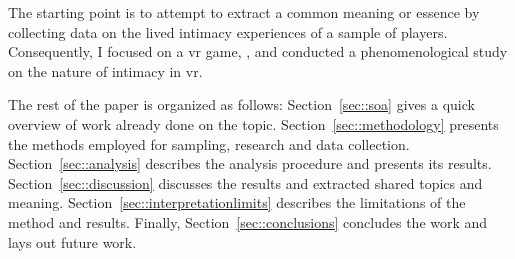 The starting point is to attempt to extract a common meaning or essence by collecting data on the lived intimacy experiences of a sample of players. 
Consequently, I focused on a \gls{vr} game, \vrc, and conducted a phenomenological study on the nature of intimacy in \gls{vr}.

The rest of the paper is organized as follows:
Section~\ref{sec::soa} gives a quick overview of work already done on the topic.
Section~\ref{sec::methodology} presents the methods employed for sampling, research and data collection.
Section~\ref{sec::analysis} describes the analysis procedure and presents its results.
Section~\ref{sec::discussion} discusses the results and extracted shared topics and meaning.
Section~\ref{sec::interpretationlimits} describes the limitations of the method and results.
Finally, Section~\ref{sec::conclusions} concludes the work and lays out future work.